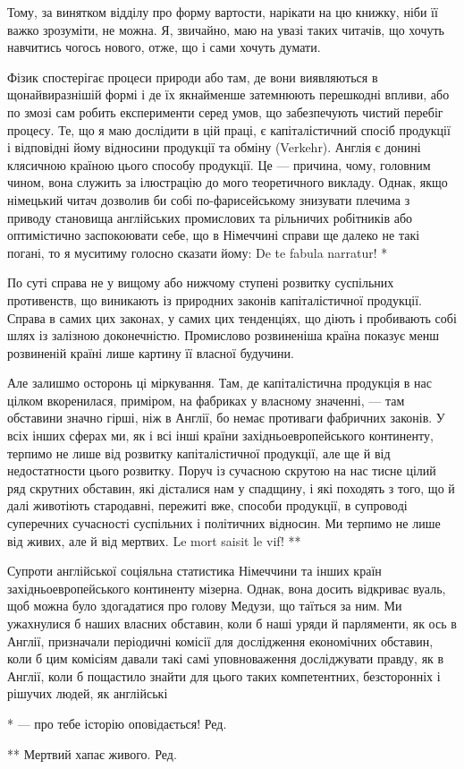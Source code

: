 Тому, за винятком відділу про форму вартости, нарікати на цю
книжку, ніби її важко зрозуміти, не можна. Я, звичайно, маю
на увазі таких читачів, що хочуть навчитись чогось нового, отже,
що і сами хочуть думати.

Фізик спостерігає процеси природи або там, де вони виявляються
в щонайвиразнішій формі і де їх якнайменше затемнюють
перешкодні впливи, або по змозі сам робить експерименти серед
умов, що забезпечують чистий перебіг процесу. Те, що я маю
дослідити в цій праці, є капіталістичний спосіб продукції і відповідні
йому відносини продукції та обміну (Verkehr). Англія
є донині клясичною країною цього способу продукції. Це —
причина, чому, головним чином, вона служить за ілюстрацію
до мого теоретичного викладу. Однак, якщо німецький читач
дозволив би собі по-фарисейському знизувати плечима з приводу
становища англійських промислових та рільничих робітників або
оптимістично заспокоювати себе, що в Німеччині справи ще далеко
не такі погані, то я муситиму голосно сказати йому: De
te fabula narratur! *

По суті справа не у вищому або нижчому ступені розвитку
суспільних противенств, що виникають із природних законів капіталістичної
продукції. Справа в самих цих законах, у самих цих
тенденціях, що діють і пробивають собі шлях із залізною доконечністю.
Промислово розвиненіша країна показує менш розвиненій
країні лише картину її власної будучини.

Але залишмо осторонь ці міркування. Там, де капіталістична
продукція в нас цілком вкоренилася, приміром, на фабриках
у власному значенні, — там обставини значно гірші, ніж в Англії,
бо немає противаги фабричних законів. У всіх інших сферах ми,
як і всі інші країни західньоевропейського континенту, терпимо
не лише від розвитку капіталістичної продукції, але ще й від
недостатности цього розвитку. Поруч із сучасною скрутою на
нас тисне цілий ряд скрутних обставин, які дісталися нам у
спадщину, і які походять з того, що й далі животіють стародавні,
пережиті вже, способи продукції, в супроводі суперечних
сучасності суспільних і політичних відносин. Ми терпимо
не лише від живих, але й від мертвих. Le mort saisit le vif! **

Супроти англійської соціяльна статистика Німеччини та інших
країн західньоевропейського континенту мізерна. Однак, вона
досить відкриває вуаль, щоб можна було здогадатися про голову
Медузи, що таїться за ним. Ми ужахнулися б наших власних
обставин, коли б наші уряди й парляменти, як ось в Англії, призначали
періодичні комісії для дослідження економічних обставин,
коли б цим комісіям давали такі самі уповноваження досліджувати
правду, як в Англії, коли б пощастило знайти для цього
таких компетентних, безсторонніх і рішучих людей, як англійські

* — про тебе історію оповідається! Ред.

** Мертвий хапає живого. Ред.
